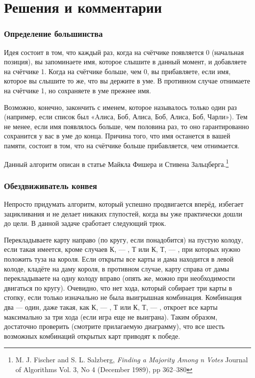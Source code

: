  \section*{Решения и комментарии}

\subsubsection*{Определение большинства}%

Идея состоит в том, что каждый раз, когда на счётчике появляется 0 (начальная позиция), 
вы запоминаете имя, которое слышите в данный момент, и добавляете на счётчике 1.
Когда на счётчике больше, чем 0, вы прибавляете, если имя, которое вы слышите то же, что вы держите в уме.
В противном случае отнимаете на счётчике 1, но сохраняете в уме прежнее имя.

Возможно, конечно, закончить с именем, которое называлось только один раз (например, если список был «Aлиса, Боб, Алиса, Боб, Алиса, Боб, Чарли»).
Тем не менее, если имя появлялось больше, чем половина раз, то оно гарантированно сохранится у вас в уме до конца.
Причина того, что имя останется в вашей памяти, состоит в том, что на счётчике больше прибавляется, чем отнимается.

Данный алгоритм описан в статье Майкла Фишера и Стивена Зальцберга.\footnote{M. J. Fischer and S. L. Salzberg, \emph{Finding a Majority Among n Votes} Journal of Algorithms Vol. 3, No 4 (December 1989), pp 362--380}

\subsubsection*{Обездвиживатель конвея}%

Непросто придумать алгоритм, который успешно продвигается вперёд, избегает зацикливания и не делает никаких глупостей, когда вы уже практически дошли до цели.
В данной задаче сработает следующий трюк.

Перекладываете карту направо (по кругу, если понадобится) на пустую колоду, если такая имеется, кроме случаев К, --- , Т или К, Т, --- , при которых нужно положить туза на короля.
Если открыты все карты и дама находится в левой колоде, кладёте на даму короля, в противном случае, карту справа от дамы перекладываете на одну колоду вправо (опять же, можно при необходимости двигаться по кругу).
Очевидно, что нет хода, который собирает три карты в стопку, если только изначально не была выигрышная комбинация.
Комбинация два --- один, даже такая, как К, --- , Т или
К, Т, --- , откроет все карты максимально за три хода (если игра еще не выиграна).
Таким образом, достаточно проверить (смотрите прилагаемую диаграмму), что все шесть возможных комбинаций открытых карт приводят к победе.
\heart

